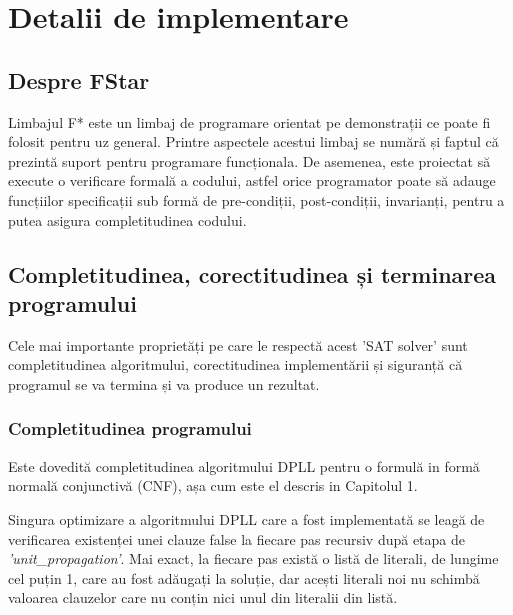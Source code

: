 \chapter{Detalii de implementare}


\section{Despre FStar}

Limbajul F* este un limbaj de programare orientat pe demonstrații ce poate fi \newline folosit pentru uz general. Printre aspectele acestui limbaj se numără și faptul că \newline prezintă suport pentru programare funcționala. De asemenea, este proiectat să execute o verificare formală a codului, astfel orice programator poate să adauge funcțiilor \newline specificații sub formă de pre-condiții, post-condiții, invarianți, pentru a putea asigura completitudinea codului.

\section{Completitudinea, corectitudinea și  \newline terminarea programului}

Cele mai importante proprietăți pe care le respectă acest 'SAT solver' sunt \newline completitudinea algoritmului, corectitudinea implementării și siguranță că programul se va termina și va produce un rezultat.

\subsection{Completitudinea programului}

Este dovedită completitudinea algoritmului DPLL pentru o formulă in formă normală conjunctivă (CNF), așa cum este el descris in Capitolul 1.

Singura optimizare a algoritmului DPLL care a fost implementată se leagă de \newline verificarea existenței unei clauze false la fiecare pas recursiv după etapa de \textit{'unit\_propagation'}. \newpage Mai exact, la fiecare pas există o listă de literali, de lungime cel puțin 1, care au fost \newline adăugați la soluție, dar acești literali noi nu schimbă valoarea clauzelor care nu conțin nici unul din literalii din listă.
 
